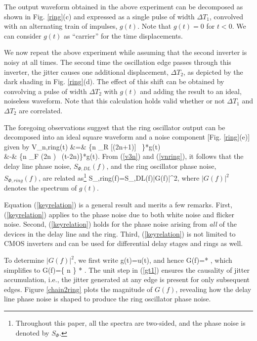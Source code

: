 The output waveform obtained in the above experiment can be decomposed as shown in Fig. \ref{ring}(c) and expressed as a single pulse of width $\Delta T_1$, convolved with an
alternating train of impulses, $g(t)$. Note that $g(t)=0$ for $t<0$. We can consider $g(t)$ as ``carrier'' for the time displacements.

We now repeat the above experiment while assuming that the second inverter is noisy at all times. The second time the oscillation edge passes through this inverter,
the jitter causes one additional displacement, $\Delta T_2$, as depicted by the dark shading in Fig. \ref{ring}(d). The effect of this shift can be obtained by
convolving a pulse of width $\Delta T_2$ with $g(t)$ and adding the result to an ideal, noiseless waveform. Note that this calculation holds valid whether or not
$\Delta T_1$ and $\Delta T_2$ are correlated.

The foregoing observations suggest that the ring oscillator output can be decomposed into an ideal square waveform and a noise component [Fig. \ref{ring}(e)] given by
\ber
V_{n,ring}(t) &=& \left\{\SumAll n \sigma_R [(2n+1)] ~\delta [t-(2n+1)\frac{T_{in}}{2}]\right\}*g(t) \nonumber\\
&-& \left\{\SumAll n \sigma_F (2n ) ~\delta (t-2n)\right\}*g(t).
\label{vnring}
\eer
From (\ref{v3n}) and (\ref{vnring}), it follows that the delay line phase noise, $S_{\Phi,DL}(f)$, and the ring oscillator phase noise, $S_{\Phi,ring}(f)$, are related
as\footnote{Throughout this paper, all the spectra are two-sided, and the phase noise is denoted by $S_{\Phi}$.}
\beq
S_{\Phi,ring}(f)=S_{\Phi,DL}(f)|G(f)|^2,
\label{keyrelation}
\eeq
where $|G(f)|^2$ denotes the spectrum of $g(t)$.

Equation (\ref{keyrelation}) is a general result and merits a few remarks. First, (\ref{keyrelation}) applies to the phase noise due to both white noise and flicker
noise. Second, (\ref{keyrelation}) holds for the phase noise arising from {\em all} of the devices in the delay line and the ring. Third, (\ref{keyrelation}) is not limited to CMOS
inverters and can be used for differential delay stages and rings as well.

To determine $|G(f)|^2$, we first write
\beq
g(t)= u(t),
\label{gt1}
\eeq
and hence
\beq
G(f)= * ,
\label{gf1}
\eeq
which simplifies to 
\beq
G(f)=\left\{ \SumAll n \delta [f-(2n+1)f_{in}]\right\} * .
\label{gf2}
\eeq
The unit step in (\ref{gt1}) ensures the causality of jitter accumulation, i.e., the jitter generated at any edge is present for only subsequent edges.
Figure \ref{chain2ring} plots the magnitude of $G(f)$, revealing how the delay line phase noise is shaped to produce the ring oscillator phase noise.


